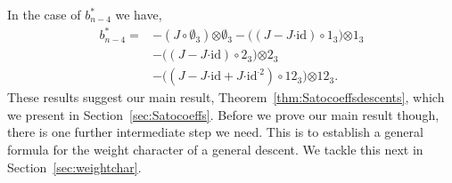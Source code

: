 \documentclass[5p,twocolumn]{elsarticle}
\newcommand*{\id}{{\mathrm{id}}}
\newcommand*{\cendot}{\boldsymbol{\cdot}}
\newcommand*{\botimes}{\boldsymbol{\otimes}}
\begin{document}
In the case of $b^\ast_{n-4}$ we have,
\begin{align*}
  b^\ast_{n-4}=&-(J\circ\emptyset_3)\botimes\emptyset_3-\bigl((J-J\cendot\id)\circ 1_3\bigr)\botimes1_3\\
         &-\bigl((J-J\cendot\id)\circ 2_3\bigr)\botimes2_3\\
         &-\bigl((J-J\cendot\id+J\cendot\id^{\cendot2})\circ 12_3\bigr)\botimes12_3.
\end{align*}
These results suggest our main result, Theorem~\ref{thm:Satocoeffsdescents}, which we present in Section~\ref{sec:Satocoeffs}.
Before we prove our main result though, there is one further intermediate step we need. This is to establish a general formula for the weight character of a general descent.
We tackle this next in Section~\ref{sec:weightchar}.
\end{document}
